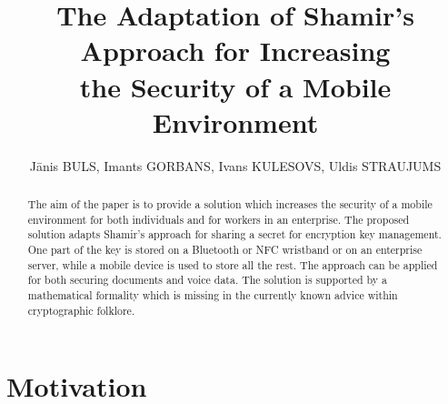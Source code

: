 \documentclass{bjmc}
\begin{document}
\title{The Adaptation of  Shamir's Approach for Increasing \\ the Security of a Mobile Environment}
  \author{J\=anis BULS, Imants GORBANS, Ivans KULESOVS, Uldis STRAUJUMS}
    

\maketitle      
\setcounter{page}{51}

\begin{abstract} 
The aim of the paper is to provide a solution which increases the
security of a mobile environment for both individuals and for 
workers in an enterprise.  The proposed solution adapts Shamir's approach for sharing a
secret for encryption key management.  One part of the key is
stored on a Bluetooth or NFC wristband or on an enterprise server, while a mobile device is
used to store all the rest.  The approach can be applied for both
securing documents and voice data. 
The solution is supported by a
mathematical formality which is missing in the currently known advice
 within cryptographic folklore.
\end{abstract}
\section{Motivation}
\end{document}
